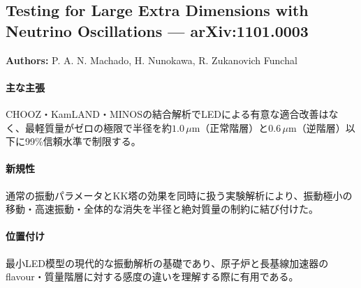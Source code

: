 \subsection{Testing for Large Extra Dimensions with Neutrino Oscillations --- arXiv:1101.0003}

\textbf{Authors:} P. A. N. Machado, H. Nunokawa, R. Zukanovich Funchal

\paragraph{主な主張}
CHOOZ・KamLAND・MINOSの結合解析でLEDによる有意な適合改善はなく、最軽質量がゼロの極限で半径を約$1.0\,\mu\mathrm{m}$（正常階層）と$0.6\,\mu\mathrm{m}$（逆階層）以下に99\%信頼水準で制限する\cite{Machado:2011LEDTests}。

\paragraph{新規性}
通常の振動パラメータとKK塔の効果を同時に扱う実験解析により、振動極小の移動・高速振動・全体的な消失を半径と絶対質量の制約に結び付けた。

\paragraph{位置付け}
最小LED模型の現代的な振動解析の基礎であり、原子炉と長基線加速器のflavour・質量階層に対する感度の違いを理解する際に有用である。
